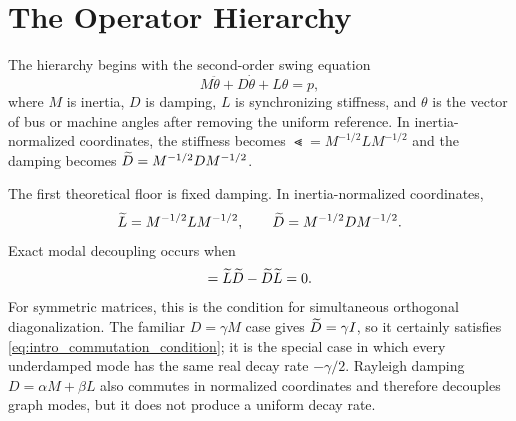

\section{The Operator Hierarchy}

The hierarchy begins with the second-order swing equation
\begin{equation}
  M\ddot\theta+D\dot\theta+L\theta=p,
  \label{eq:intro_swing}
\end{equation}
where \(M\) is inertia, \(D\) is damping, \(L\) is synchronizing stiffness, and
\(\theta\) is the vector of bus or machine angles after removing the uniform
reference. In inertia-normalized coordinates, the stiffness becomes
\(\Lt=M^{-1/2}LM^{-1/2}\) and the damping becomes
\(\widetilde D=M^{-1/2}DM^{-1/2}\).

The first theoretical floor is fixed damping. In inertia-normalized
coordinates,
\begin{equation}
  \widetilde L=M^{-1/2}LM^{-1/2},\qquad
  \widetilde D=M^{-1/2}DM^{-1/2}.
  \label{eq:intro_normalized_operators}
\end{equation}
Exact modal decoupling occurs when
\begin{equation}
  [\Lt,\Dt]=\Lt\Dt-\Dt\Lt=0.
  \label{eq:intro_commutation_condition}
\end{equation}
For symmetric matrices, this is the condition for simultaneous orthogonal
diagonalization. The familiar \(D=\gamma M\) case gives
\(\widetilde D=\gamma I\), so it certainly satisfies
\eqref{eq:intro_commutation_condition}; it is the special case in which every
underdamped mode has the same real decay rate \(-\gamma/2\). Rayleigh damping
\(D=\alpha M+\beta L\) also commutes in normalized coordinates and therefore
decouples graph modes, but it does not produce a uniform decay rate.

